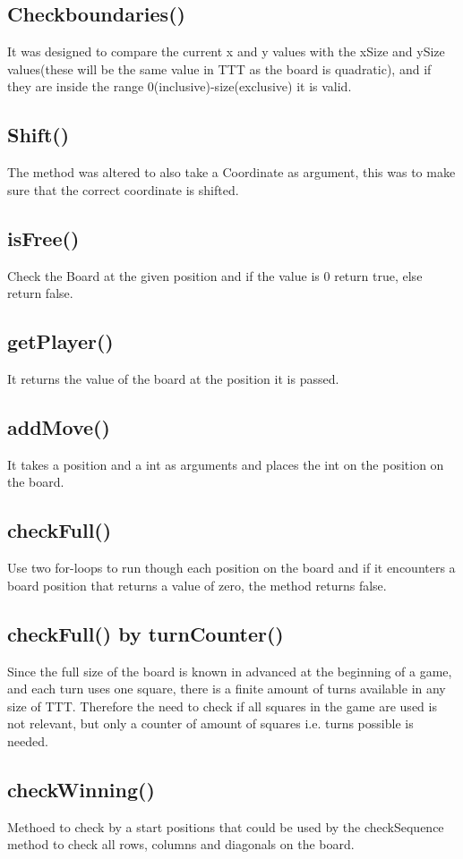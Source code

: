 \documentclass[a4paper,10pt]{article}
\begin{document}
			\subsection{Checkboundaries()}
		It was designed to compare the current x and y values with the xSize and ySize values(these will be the same value in TTT as the board is quadratic), and if they are inside the range 0(inclusive)-size(exclusive) it is valid.
		\subsection{Shift()}
		The method was altered to also take a Coordinate as argument, this was to make sure that the correct coordinate is shifted.
		\subsection{isFree()}
		Check the Board at the given position and if the value is 0 return true, else return false.
		\subsection{getPlayer()}
		It returns the value of the board at the position it is passed.
		\subsection{addMove()}
		It takes a position and a int as arguments and places the int on the position on the board.
		\subsection{checkFull()}
		Use two for-loops to run though each position on the board and if it encounters a board position that returns a value of zero, the method returns false.
		
		\subsection{checkFull() by turnCounter()}
		Since the full size of the board is known in advanced at the beginning of a game, and each turn uses one square,  there is a finite amount of turns available in any size of TTT. Therefore the need to check if all squares in the game are used is not relevant, but only a counter of amount of squares i.e. turns possible is needed. 
				
		\subsection{checkWinning()}
		Methoed to check by a  start positions that could be used by the checkSequence method to check all rows, columns and diagonals on the board. 
\end{document}
